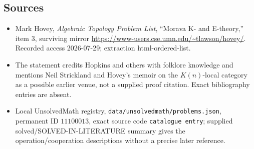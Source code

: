 \documentclass[11pt]{article}
\begin{document}
\subsection{Sources}
\begin{itemize}
\item Mark Hovey, \emph{Algebraic Topology Problem List}, ``Morava K- and E-theory,'' item 3, surviving mirror \url{https://www-users.cse.umn.edu/~tlawson/hovey/}. Recorded access 2026-07-29; extraction html-ordered-list.
\item The statement credits Hopkins and others with folklore knowledge and mentions Neil Strickland and Hovey's memoir on the \(K(n)\)-local category as a possible earlier venue, not a supplied proof citation. Exact bibliography entries are absent.
\item Local UnsolvedMath registry, \texttt{data/unsolvedmath/problems.json}, permanent ID \(11100013\), exact source code \texttt{catalogue entry}; supplied solved/SOLVED-IN-LITERATURE summary gives the operation/cooperation descriptions without a precise later reference.
\end{itemize}
\end{document}
